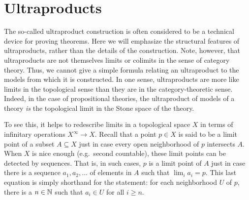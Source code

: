 


\section{Ultraproducts} \label{ultrap}

The so-called ultraproduct construction is often considered to be a
technical device for proving theorems.  Here we will emphasize the
structural features of ultraproducts, rather than the details of the
construction.  Note, however, that ultraproducts are not themselves
limits or colimits in the sense of category theory.  Thus, we cannot
give a simple formula relating an ultraproduct to the models from
which it is constructed.  In one sense, ultraproducts are more like
limits in the topological sense than they are in the
category-theoretic sense.  Indeed, in the case of propositional
theories, the ultraproduct of models of a theory \textit{is} the
topological limit in the Stone space of the theory.

To see this, it helps to redescribe limits in a topological space $X$
in terms of infinitary operations $X^{\infty}\to X$.  Recall that a
point $p\in X$ is said to be a limit point of a subset $A\subseteq X$
just in case every open neighborhood of $p$ intersects $A$.  When $X$
is nice enough (e.g.\ second countable), these limit points can be
detected by sequences.  That is, in such cases, $p$ is a limit point
of $A$ just in case there is a sequence $a_1,a_2,\dots $ of elements
in $A$ such that $\lim _ia_i=p$.  This last equation is simply
shorthand for the statement: for each neighborhood $U$ of $p$, there
is a $n\in\mathbb N$ such that $a_i\in U$ for all $i\geq n$.

